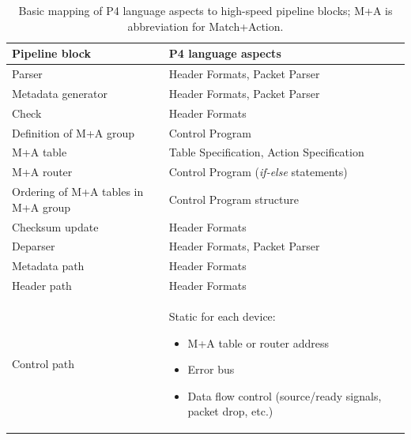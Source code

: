 \begin{table}[h]
    \centering
    \begin{tabular}{|l|p{}|}
        \hline
        \T \textbf{Pipeline block}             & \textbf{P4 language aspects} \\
        \hline\hline
        \T Parser                              & Header Formats, Packet Parser\\  
        \T Metadata generator                  & Header Formats, Packet Parser\\  
        \T Check                               & Header Formats  \\ \hline
        \T Definition of M+A group             & Control Program \\ 
        \T M+A table                           & Table Specification, Action Specification\\ 
        \T M+A router                          & Control Program (\textit{if-else} statements)\\
        \T Ordering of M+A tables in M+A group & Control Program structure \\ \hline
        \T Checksum update                     & Header Formats\\ \hline
        \T Deparser                            & Header Formats, Packet Parser \\ \hline
        \T Metadata path                       & Header Formats \\ 
        \T Header path                         & Header Formats \\ 
         Control path                          & Static for each device:
                                            \vspace{-9pt}
                                            \begin{itemize}
                                                  \setlength{\itemsep}{0pt}
                                                  \setlength{\parskip}{0pt}
                                                \item M+A table or router address
                                                \item Error bus
                                                \item Data flow control (source/ready signals, packet drop, etc.)
                                            \end{itemize} \\
        \hline
    \end{tabular} 
    \caption{Basic mapping of P4 language aspects to high-speed pipeline blocks; M+A is abbreviation for Match+Action.}
    \label{tab:mappingP4ToPipeline}
\end{table}

